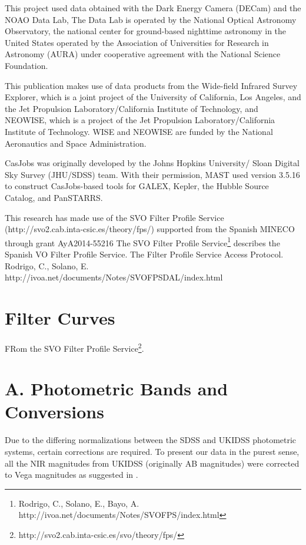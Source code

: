 \documentclass[usenatbib]{mnras}
\begin{document}
This project used data obtained with the Dark Energy Camera (DECam)
and the NOAO Data Lab, The Data Lab is operated by the National
Optical Astronomy Observatory, the national center for ground-based
nighttime astronomy in the United States operated by the Association
of Universities for Research in Astronomy (AURA) under cooperative
agreement with the National Science Foundation.

This publication makes use of data products from the Wide-field
Infrared Survey Explorer, which is a joint project of the University
of California, Los Angeles, and the Jet Propulsion
Laboratory/California Institute of Technology, and NEOWISE, which is a
project of the Jet Propulsion Laboratory/California Institute of
Technology. WISE and NEOWISE are funded by the National Aeronautics
and Space Administration.

CasJobs was originally developed by the Johns Hopkins University/
Sloan Digital Sky Survey (JHU/SDSS) team. With their permission, MAST
used version 3.5.16 to construct CasJobs-based tools for GALEX,
Kepler, the Hubble Source Catalog, and PanSTARRS.

This research has made use of the SVO Filter Profile Service
(http://svo2.cab.inta-csic.es/theory/fps/) supported from the Spanish
MINECO through grant AyA2014-55216 
The SVO Filter Profile Service\footnote{Rodrigo, C., Solano, E., Bayo, A. http://ivoa.net/documents/Notes/SVOFPS/index.html}
describes the Spanish VO Filter Profile Service. 
The Filter Profile Service Access Protocol. Rodrigo, C., Solano, E. http://ivoa.net/documents/Notes/SVOFPSDAL/index.html

\newpage

\appendix
\section{Filter Curves} 
FRom the SVO Filter Profile Service\footnote{http://svo2.cab.inta-csic.es/svo/theory/fps/}.

\section{A. Photometric Bands and Conversions}
    Due to the differing normalizations between the
    SDSS and  UKIDSS photometric systems, certain corrections are required.  To present
    our data in the  purest sense, all the NIR magnitudes from UKIDSS
    (originally AB magnitudes)  were corrected to Vega magnitudes as
    suggested in \citet{Hewett2006}.
    
\end{document}
